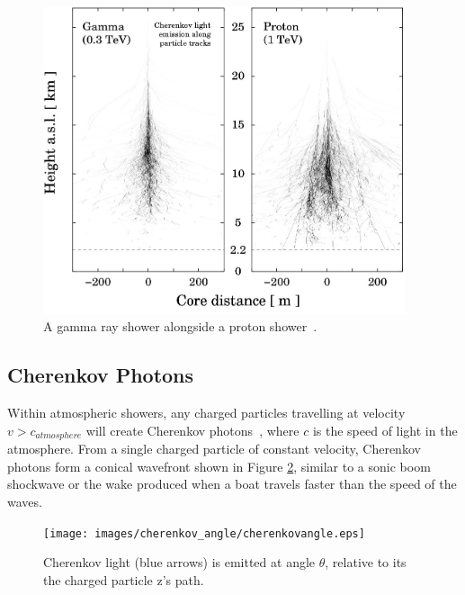   \begin{figure}[ht]
    \centering
    \includegraphics[width=0.95\textwidth]{images/showers_gamma_proton}
    \caption[Gamma Ray and Proton Showers]{
      A gamma ray shower alongside a proton shower~\cite{Bernlohr2008149}.
    }
    \label{fig:gamma_vs_proton_airshower}
  \end{figure}
  
  \FloatBarrier

  \subsection{Cherenkov Photons}\label{sec:cherenkov}

  Within atmospheric showers, any charged particles travelling at velocity $v > c_{atmosphere}$ will create Cherenkov photons~\cite{cherenkov}, where $c$ is the speed of light in the atmosphere.
  From a single charged particle of constant velocity, Cherenkov photons form a conical wavefront shown in Figure \ref{fig:cherenkovangle}, similar to a sonic boom shockwave or the wake produced when a boat travels faster than the speed of the waves.

  \begin{figure}[ht]
    \centering
    \texttt{[image: images/cherenkov\_angle/cherenkovangle.eps]}
    \caption[Chernekov Emission Angle]{
      Cherenkov light (blue arrows) is emitted at angle $\theta$, relative to its the charged particle z's path.
    }
    \label{fig:cherenkovangle}
  \end{figure}

